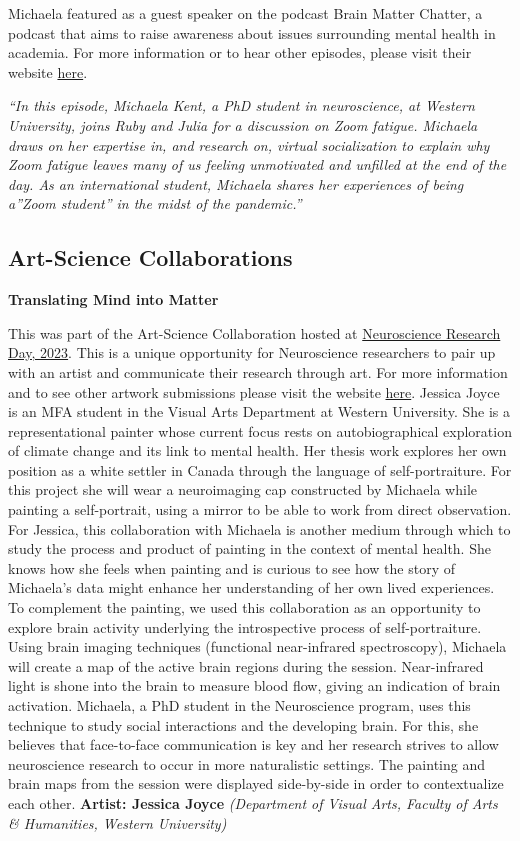 \documentclass[
]{article}
\begin{document}
Michaela featured as a guest speaker on the podcast Brain Matter
Chatter, a podcast that aims to raise awareness about issues surrounding
mental health in academia. For more information or to hear other
episodes, please visit their website
\href{https://songsuwo.ca/brainmatterchatter}{here}.

\emph{``In this episode, Michaela Kent, a PhD student in neuroscience,
at Western University, joins Ruby and Julia for a discussion on Zoom
fatigue. Michaela draws on her expertise in, and research on, virtual
socialization to explain why Zoom fatigue leaves many of us feeling
unmotivated and unfilled at the end of the day. As an international
student, Michaela shares her experiences of being a''Zoom student'' in
the midst of the pandemic.''}

\hypertarget{art-science-collaborations}{%
\subsection{Art-Science
Collaborations}\label{art-science-collaborations}}

\textbf{Translating Mind into Matter}

This was part of the Art-Science Collaboration hosted at
\href{https://songsuwo.ca/nrd2023}{Neuroscience Research Day, 2023}.
This is a unique opportunity for Neuroscience researchers to pair up
with an artist and communicate their research through art. For more
information and to see other artwork submissions please visit the
website \href{https://songsuwo.ca/brain-art}{here}. Jessica Joyce is an
MFA student in the Visual Arts Department at Western University. She is
a representational painter whose current focus rests on autobiographical
exploration of climate change and its link to mental health. Her thesis
work explores her own position as a white settler in Canada through the
language of self-portraiture. For this project she will wear a
neuroimaging cap constructed by Michaela while painting a self-portrait,
using a mirror to be able to work from direct observation. For Jessica,
this collaboration with Michaela is another medium through which to
study the process and product of painting in the context of mental
health. She knows how she feels when painting and is curious to see how
the story of Michaela's data might enhance her understanding of her own
lived experiences. To complement the painting, we used this
collaboration as an opportunity to explore brain activity underlying the
introspective process of self-portraiture. Using brain imaging
techniques (functional near-infrared spectroscopy), Michaela will create
a map of the active brain regions during the session. Near-infrared
light is shone into the brain to measure blood flow, giving an
indication of brain activation. Michaela, a PhD student in the
Neuroscience program, uses this technique to study social interactions
and the developing brain. For this, she believes that face-to-face
communication is key and her research strives to allow neuroscience
research to occur in more naturalistic settings. The painting and brain
maps from the session were displayed side-by-side in order to
contextualize each other. \textbf{Artist: Jessica Joyce}
\emph{(Department of Visual Arts, Faculty of Arts \& Humanities, Western
University)}
\end{document}
